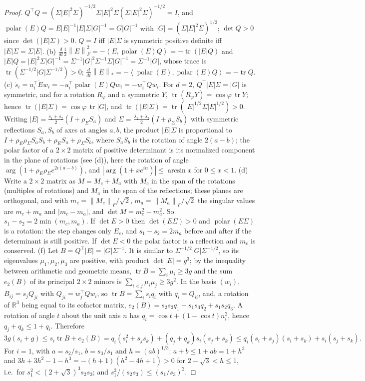 \documentclass[11pt]{article}
\theoremstyle{definition}
\theoremstyle{remark}
\newcommand{\R}{\mathbb{R}}
\newcommand{\nnuc}[1]{\left\|#1\right\|_{*}}
\newcommand{\nF}[1]{\left\|#1\right\|_{F}}
\newcommand{\inner}[2]{\left\langle #1, #2 \right\rangle}
\newcommand{\abs}[1]{\left|#1\right|}
\newcommand{\tr}{\operatorname{tr}}
\newcommand{\polar}{\operatorname{polar}}
\begin{document}
\begin{proof}
$Q^\top Q=(\Sigma\abs E^2\Sigma)^{-1/2}\Sigma\abs E^2\Sigma(\Sigma\abs E^2\Sigma)^{-1/2}=I$, and
$\polar(E)Q=E\abs E^{-1}\abs E\Sigma\abs G^{-1}=G\abs G^{-1}$ with $\abs G=(\Sigma\abs E^2\Sigma)^{1/2}$;
$\det Q>0$ since $\det(\abs E\Sigma)>0$. $Q=I$ iff $\abs E\Sigma$ is symmetric positive definite iff $\abs E\Sigma=\Sigma\abs E$.
(b) $\frac d{dt}\frac12\nF E^2=-\inner E{\polar(E)Q}=-\tr(\abs EQ)$
and $\abs EQ=\abs E^2\Sigma\abs G^{-1}=\Sigma^{-1}\abs G^2\Sigma^{-1}\Sigma\abs G^{-1}=\Sigma^{-1}\abs G$, whose trace is
$\tr(\Sigma^{-1/2}\abs G\Sigma^{-1/2})>0$; $\frac d{dt}\nnuc E=-\inner{\polar(E)}{\polar(E)Q}=-\tr Q$.
(c) $\dot s_i=u_i^\top\dot Ew_i=-u_i^\top\polar(E)Qw_i=-w_i^\top Qw_i$. For $d=2$, $Q^\top\abs E\Sigma=\abs G$ is symmetric,
and for a rotation $R_\varphi$ and a symmetric $Y$, $\tr(R_\varphi Y)=\cos\varphi\,\tr Y$; hence
$\tr(\abs E\Sigma)=\cos\varphi\,\tr\abs G$, and $\tr(\abs E\Sigma)=\tr(\abs E^{1/2}\Sigma\abs E^{1/2})>0$. Writing
$\abs E=\frac{s_1+s_2}2(I+\rho_ES_a)$ and $\Sigma=\frac{\lambda_1+\lambda_2}2(I+\rho_\Sigma S_b)$ with symmetric
reflections $S_a,S_b$ of axes at angles $a,b$, the product $\abs E\Sigma$ is proportional to
$I+\rho_E\rho_\Sigma S_aS_b+\rho_ES_a+\rho_\Sigma S_b$, where $S_aS_b$ is the rotation of angle $2(a-b)$; the polar factor
of a $2\times2$ matrix of positive determinant is its normalized component in the plane of rotations (see (d)), here
the rotation of angle $\arg(1+\rho_E\rho_\Sigma e^{2i(a-b)})$, and $\abs{\arg(1+xe^{i\alpha})}\le\arcsin x$ for $0\le x<1$.
(d) Write a $2\times2$ matrix as $M=M_c+M_a$ with $M_c$ in the span of the rotations (multiples of rotations) and $M_a$
in the span of the reflections; these planes are orthogonal, and with $m_c=\nF{M_c}/\sqrt2$, $m_a=\nF{M_a}/\sqrt2$ the
singular values are $m_c+m_a$ and $\abs{m_c-m_a}$, and $\det M=m_c^2-m_a^2$. So $s_1-s_2=2\min(m_c,m_a)$. If
$\det E>0$ then $\det(E\Sigma)>0$ and $\polar(E\Sigma)$ is a rotation: the step changes only $E_c$, and
$s_1-s_2=2m_a$ before and after if the determinant is still positive. If $\det E<0$ the polar factor is a reflection
and $m_c$ is conserved.
(f) Let $B=Q^\top\abs E=\abs G\Sigma^{-1}$. It is similar to $\Sigma^{-1/2}\abs G\Sigma^{-1/2}$, so its eigenvalues
$\mu_1,\mu_2,\mu_3$ are positive, with product $\det\abs E=g^3$; by the inequality between arithmetic and geometric
means, $\tr B=\sum_i\mu_i\ge3g$ and the sum $e_2(B)$ of its principal $2\times2$ minors is $\sum_{i<j}\mu_i\mu_j\ge3g^2$. In
the basis $(w_i)$, $B_{ij}=s_jQ_{ji}$ with $Q_{ji}=w_j^\top Qw_i$, so $\tr B=\sum_is_iq_i$ with $q_i=Q_{ii}$, and, a
rotation of $\R^3$ being equal to its cofactor matrix, $e_2(B)=s_2s_3q_1+s_1s_3q_2+s_1s_2q_3$. A rotation of angle $t$
about the unit axis $n$ has $q_i=\cos t+(1-\cos t)n_i^2$, hence $q_j+q_k\le1+q_i$. Therefore
\[
3g(s_i+g)\le s_i\tr B+e_2(B)=q_i(s_i^2+s_js_k)+(q_j+q_k)s_i(s_j+s_k)\le q_i(s_i+s_j)(s_i+s_k)+s_i(s_j+s_k).
\]
For $i=1$, with $a=s_2/s_1$, $b=s_3/s_1$ and $h=(ab)^{1/3}$: $a+b\le1+ab=1+h^3$ and
$3h+3h^2-1-h^3=-(h+1)(h^2-4h+1)>0$ for $2-\sqrt3<h\le1$, i.e.\ for $s_1^2<(2+\sqrt3)^3s_2s_3$; and
$s_1^2/(s_2s_3)\le(s_1/s_3)^2$.
\end{proof}
\end{document}
